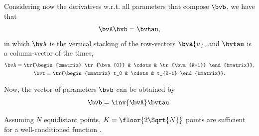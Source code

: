 Considering now the derivatives w.r.t. all parameters that compose $\bvb$, we have that
\begin{equation}
	\bvA \bvb = \bvtau,
\end{equation}
in which $\bvA$ is the vertical stacking of the row-vectors $\bva{u}$, and $\bvtau$ is a column-vector of the times,
\begin{subequations}
	\begin{gather}
		\bvA = \tr{\begin{bmatrix}
				\tr{\bva{0}} & \cdots & \tr{\bva{K-1}}
		\end{bmatrix}}, \\
		\bvt = \tr{\begin{bmatrix}
				t_0 & \cdots & t_{K-1}
		\end{bmatrix}}.
	\end{gather}
\end{subequations}

Now, the vector of parameters $\bvb$ can be obtained by
\begin{equation}
	\bvb = \inv{\bvA} \bvtau.
\end{equation}

Assuming $N$ equidistant points, $K = \floor{2\Sqrt{N}}$ points are sufficient for a well-conditioned function \cite{dahlquist_numerical_2008a}.


%
%
%

